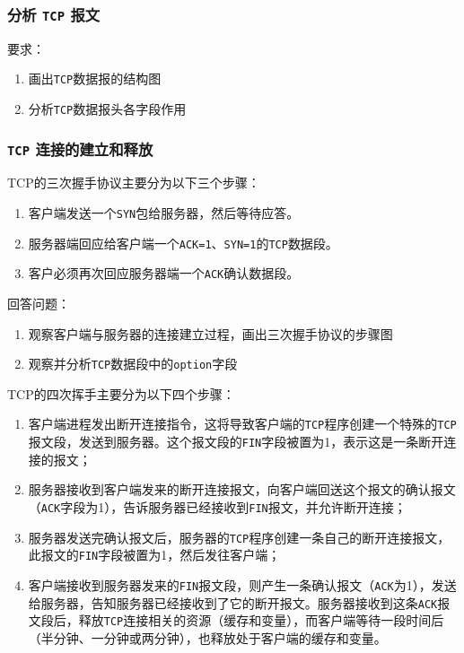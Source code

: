 \documentclass{article}
\begin{document}
\subsubsection{分析 \texttt{TCP} 报文}

要求：
\begin{enumerate}[noitemsep]
  \item 画出\texttt{TCP}数据报的结构图
  \item 分析\texttt{TCP}数据报头各字段作用
\end{enumerate}

\subsubsection{\texttt{TCP} 连接的建立和释放}

TCP的三次握手协议主要分为以下三个步骤：
\begin{enumerate}[noitemsep]
  \item 客户端发送一个\texttt{SYN}包给服务器，然后等待应答。
  \item 服务器端回应给客户端一个\texttt{ACK=1}、\texttt{SYN=1}的\texttt{TCP}数据段。
  \item 客户必须再次回应服务器端一个\texttt{ACK}确认数据段。
\end{enumerate}

回答问题：
\begin{enumerate}[noitemsep]
  \item 观察客户端与服务器的连接建立过程，画出三次握手协议的步骤图
  \item 观察并分析\texttt{TCP}数据段中的\texttt{option}字段
\end{enumerate}

TCP的四次挥手主要分为以下四个步骤：
\begin{enumerate}[noitemsep]
  \item 客户端进程发出断开连接指令，这将导致客户端的\texttt{TCP}程序创建一个特殊的\texttt{TCP}报文段，发送到服务器。这个报文段的\texttt{FIN}字段被置为1，表示这是一条断开连接的报文；
  \item 服务器接收到客户端发来的断开连接报文，向客户端回送这个报文的确认报文（\texttt{ACK}字段为1），告诉服务器已经接收到\texttt{FIN}报文，并允许断开连接；
  \item 服务器发送完确认报文后，服务器的\texttt{TCP}程序创建一条自己的断开连接报文，此报文的\texttt{FIN}字段被置为1，然后发往客户端；
  \item 客户端接收到服务器发来的\texttt{FIN}报文段，则产生一条确认报文（\texttt{ACK}为1），发送给服务器，告知服务器已经接收到了它的断开报文。服务器接收到这条\texttt{ACK}报文段后，释放\texttt{TCP}连接相关的资源（缓存和变量），而客户端等待一段时间后（半分钟、一分钟或两分钟），也释放处于客户端的缓存和变量。
\end{enumerate}
\end{document}
